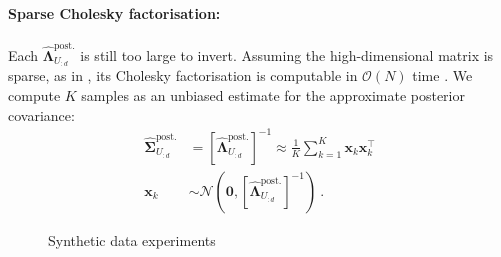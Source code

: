 \documentclass{article}
\theoremstyle{plain}
\theoremstyle{definition}
\theoremstyle{remark}
\def\*#1{\boldsymbol{#1}}
\begin{document}
\paragraph{Sparse Cholesky factorisation:} 

Each $\hat{\*\Lambda}_{U_{:d}}^{\text{post.}}$ is still too large to invert. Assuming the high-dimensional matrix is sparse, as in \citet{zhang2018largescaleprec}, its Cholesky factorisation is computable in $\mathcal{O}(N)$ time \cite{davis2004column}. We compute $K$ samples as an unbiased estimate for the approximate posterior covariance:
\begin{align*}
\hat{\*\Sigma}_{U_{:d}}^{\text{post.}} &= \left[ \hat{\*\Lambda}_{U_{:d}}^{\text{post.}}\right]^{-1} \approx \frac{1}{K} \sum_{k=1}^{K} \*x_k \*x_k^\top 
\\
\*x_k &\sim \mathcal{N}\left(\*0, \left[\hat{\*\Lambda}_{U_{:d}}^{\text{post.}}\right]^{-1} \right) \ .
\end{align*}


\begin{figure*}[t!]
\centering
{}

\caption{Synthetic data experiments} \label{fig:SynthDataExps}
\end{figure*}
\end{document}
